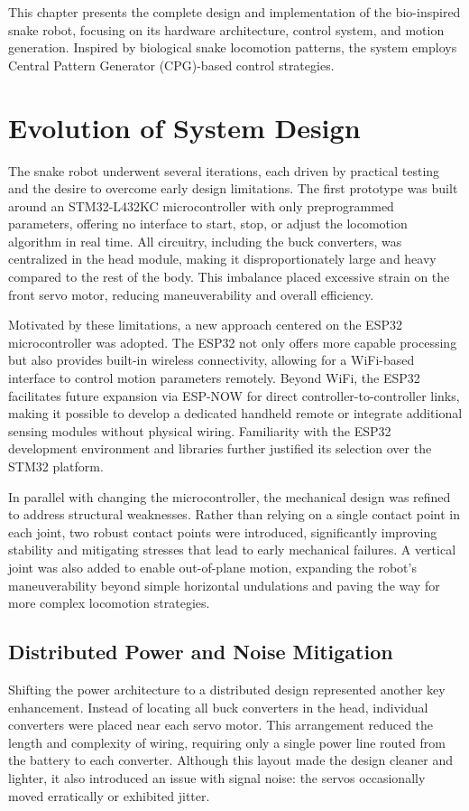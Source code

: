 \documentclass[12pt,a4paper]{report}
\begin{document}
This chapter presents the complete design and implementation of the bio-inspired snake robot, focusing on its hardware architecture, control system, and motion generation. Inspired by biological snake locomotion patterns, the system employs Central Pattern Generator (CPG)-based control strategies.


\section{Evolution of System Design}
The snake robot underwent several iterations, each driven by practical testing and the desire to overcome early design limitations. The first prototype was built around an STM32-L432KC microcontroller with only preprogrammed parameters, offering no interface to start, stop, or adjust the locomotion algorithm in real time. All circuitry, including the buck converters, was centralized in the head module, making it disproportionately large and heavy compared to the rest of the body. This imbalance placed excessive strain on the front servo motor, reducing maneuverability and overall efficiency.

Motivated by these limitations, a new approach centered on the ESP32 microcontroller was adopted. The ESP32 not only offers more capable processing but also provides built-in wireless connectivity, allowing for a WiFi-based interface to control motion parameters remotely. Beyond WiFi, the ESP32 facilitates future expansion via ESP-NOW for direct controller-to-controller links, making it possible to develop a dedicated handheld remote or integrate additional sensing modules without physical wiring. Familiarity with the ESP32 development environment and libraries further justified its selection over the STM32 platform.

In parallel with changing the microcontroller, the mechanical design was refined to address structural weaknesses. Rather than relying on a single contact point in each joint, two robust contact points were introduced, significantly improving stability and mitigating stresses that lead to early mechanical failures. A vertical joint was also added to enable out-of-plane motion, expanding the robot’s maneuverability beyond simple horizontal undulations and paving the way for more complex locomotion strategies.

\subsection{Distributed Power and Noise Mitigation}
Shifting the power architecture to a distributed design represented another key enhancement. Instead of locating all buck converters in the head, individual converters were placed near each servo motor. This arrangement reduced the length and complexity of wiring, requiring only a single power line routed from the battery to each converter. Although this layout made the design cleaner and lighter, it also introduced an issue with signal noise: the servos occasionally moved erratically or exhibited jitter.
\end{document}
